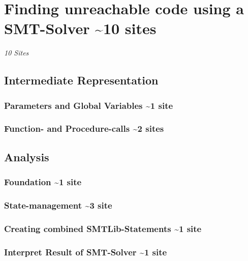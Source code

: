 
% 
\chapter{Finding unreachable code using a SMT-Solver \textasciitilde 10 sites}
\label{cha:finding unreachable code using a smt-solver}
\emph{10 Sites}

\section{Intermediate Representation}
\subsection{Parameters and Global Variables \textasciitilde 1 site}
\subsection{Function- and Procedure-calls \textasciitilde 2 sites}
\section{Analysis}
\subsection{Foundation \textasciitilde 1 site}
\subsection{State-management \textasciitilde 3 site}
\subsection{Creating combined SMTLib-Statements \textasciitilde 1 site}
\subsection{Interpret Result of SMT-Solver \textasciitilde 1 site}
